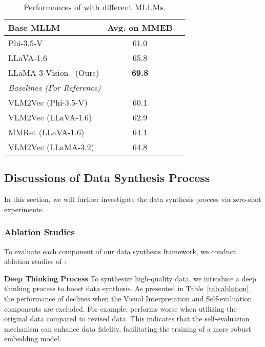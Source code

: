 \begin{table}[!t]
    \centering
    \small
    \begin{tabular}{p{}cc}
    \toprule
        Base MLLM & Avg. on MMEB  \\
        \midrule
        Phi-3.5-V~\cite{Phi3} &   61.0 \\
        LLaVA-1.6~\cite{Llava} &  65.8  \\
        LLaMA-3-Vision~\cite{llama3} (Ours)  & \textbf{69.8}  \\
    \midrule
    \multicolumn{2}{l}{\textit{Baselines (For Reference)}} \\ 
    \midrule
        VLM2Vec (Phi-3.5-V) &   60.1 \\
        VLM2Vec (LLaVA-1.6) &   62.9 \\
        MMRet (LLaVA-1.6) &   64.1 \\
        VLM2Vec (LLaMA-3.2) &   64.8 \\
    \bottomrule
    \end{tabular}
    \caption{Performances of \ours{} with different MLLMs.}
    \label{tab:base_model}
\end{table} 

\subsection{Discussions of Data Synthesis Process}

In this section, we will further investigate the data synthesis process via zero-shot experiments.


\subsubsection{Ablation Studies}

To evaluate each component of our data synthesis framework, we conduct ablation studies of \ours{}:

\noindent \textbf{Deep Thinking Process}
To synthesize high-quality data, we introduce a deep thinking process to boost data synthesis.
As presented in Table~\ref{tab:ablation}, the performance of \ours{} declines when the Visual Interpretation and Self-evaluation components are excluded.
For example, \ours{} performs worse when utilizing the original data compared to revised data.
This indicates that the self-evaluation mechanism can enhance data fidelity, facilitating the training of a more robust embedding model.


